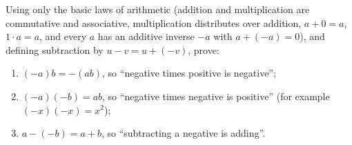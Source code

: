Using only the basic laws of arithmetic (addition and multiplication are commutative and associative, multiplication distributes over addition, $a+0=a$, $1\cdot a=a$, and every $a$ has an additive inverse $-a$ with $a+(-a)=0$), and defining subtraction by $u-v=u+(-v)$, prove:
\begin{enumerate}
\item[(a)] $(-a)b=-(ab)$, so ``negative times positive is negative'';
\item[(b)] $(-a)(-b)=ab$, so ``negative times negative is positive'' (for example $(-x)(-x)=x^2$);
\item[(c)] $a-(-b)=a+b$, so ``subtracting a negative is adding''.
\end{enumerate}
